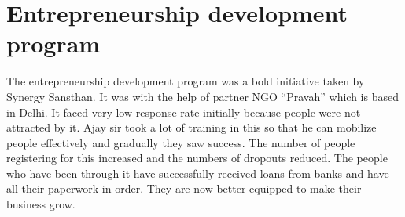 \section{Entrepreneurship development program}
The entrepreneurship development program was a bold initiative taken by Synergy Sansthan. It was with the help of partner NGO ``Pravah'' which is based in Delhi. It faced very low response rate initially because people were not attracted by it. Ajay sir took a lot of training in this so that he can mobilize people effectively and gradually they saw success. The number of people registering for this increased and the numbers of dropouts reduced. The people who have been through it have successfully received loans from banks and have all their paperwork in order. They are now better equipped to make their business grow. 






